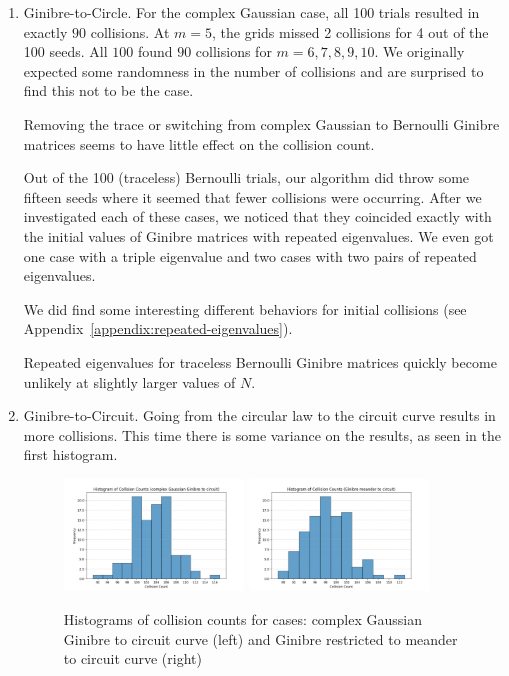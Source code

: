 \documentclass{article}
\begin{document}
	\begin{enumerate}
		\item Ginibre-to-Circle. For the complex Gaussian case, 
		all 100 trials resulted in exactly $90$ collisions. 
		At $m=5$, the grids missed 2 collisions for 4 out of the 100 seeds. 
		All $100$ found $90$ collisions for $m=6,7,8,9,10$.    
		We originally expected some randomness in the number of collisions and are surprised 
		to find this not to be the case. 
		
		Removing the trace or switching from complex Gaussian to Bernoulli Ginibre matrices 
		seems to have little effect on the collision count.
	
		Out of the 100 (traceless) Bernoulli trials, our algorithm did throw some fifteen seeds 
		where it seemed that fewer collisions were occurring. 
		After we investigated each of these cases, we noticed that they coincided exactly with the 
		initial values of Ginibre matrices with repeated eigenvalues. We even got one case
		with a triple eigenvalue and two cases with two pairs of repeated eigenvalues.
				
		We did find some interesting different behaviors for initial collisions 
		(see Appendix~\ref{appendix:repeated-eigenvalues}).
		
		Repeated eigenvalues for traceless Bernoulli Ginibre matrices quickly become unlikely 
		at slightly larger values of $N$.

		\item Ginibre-to-Circuit. Going from the circular law to the circuit curve results in
		more collisions. This time there is some variance on the results, as seen in the first histogram. 

		\begin{figure}[htbp]
			\centering
			\includegraphics[width=0.45\textwidth]{figures/GinibreToCircuit.pdf}
			\includegraphics[width=0.45\textwidth]{figures/GinibreMeanderToCircuit.pdf}	
			\caption{Histograms of collision counts for cases: complex Gaussian Ginibre 
			to circuit curve (left) and 
			Ginibre restricted to meander to circuit curve (right)}
			\label{fig:pdf_image}
		\end{figure}
	


\end{enumerate}
\end{document}
